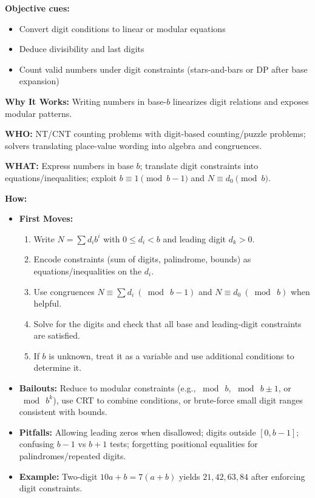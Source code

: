\documentclass[12pt]{article}
\begin{document}
\textbf{Objective cues:}
\begin{itemize}
    \item Convert digit conditions to linear or modular equations
    \item Deduce divisibility and last digits
    \item Count valid numbers under digit constraints (stars-and-bars or DP after base expansion)
\end{itemize}

\textbf{Why It Works:} Writing numbers in base-$b$ linearizes digit relations and exposes modular patterns.

\textbf{WHO:} NT/CNT counting problems with digit-based counting/puzzle problems; solvers translating place-value wording into algebra and congruences.

\textbf{WHAT:} Express numbers in base $b$; translate digit constraints into equations/inequalities; exploit $b \equiv 1 \pmod{b-1}$ and $N \equiv d_0 \pmod{b}$.


\textbf{How:}
\begin{itemize}
    \item \textbf{First Moves:}
    \begin{enumerate}[nosep]
        \item Write $N = \sum d_i b^i$ with $0 \le d_i < b$ and leading digit $d_k > 0$.
        \item Encode constraints (sum of digits, palindrome, bounds) as equations/inequalities on the $d_i$.
        \item Use congruences $N \equiv \sum d_i \ (\bmod\ b-1)$ and $N \equiv d_0 \ (\bmod\ b)$ when helpful.
        \item Solve for the digits and check that all base and leading-digit constraints are satisfied.
        \item If $b$ is unknown, treat it as a variable and use additional conditions to determine it.
    \end{enumerate}
    \item \textbf{Bailouts:} Reduce to modular constraints (e.g., $\bmod\ b$, $\bmod\ b\!\pm\!1$, or $\bmod\ b^k$), use CRT to combine conditions, or brute-force small digit ranges consistent with bounds.
    \item \textbf{Pitfalls:} Allowing leading zeros when disallowed; digits outside $[0,b-1]$; confusing $b-1$ vs $b+1$ tests; forgetting positional equalities for palindromes/repeated digits.
    \item \textbf{Example:} Two-digit $10a+b=7(a+b)$ yields $21,42,63,84$ after enforcing digit constraints.
\end{itemize}
\end{document}
